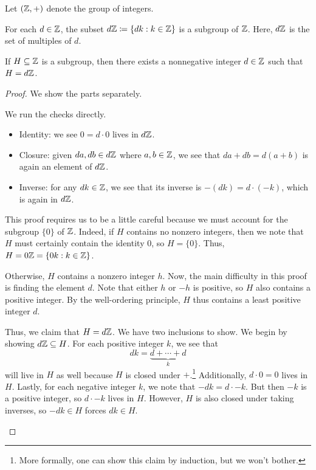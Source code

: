 \documentclass[../notes.tex]{subfiles}
\begin{document}
\begin{proposition}
    Let $(\mathbb Z,+)$ denote the group of integers.
    \begin{listalph}
        \item For each $d\in\mathbb Z$, the subset $d\mathbb Z\coloneqq\{dk:k\in\mathbb Z\}$ is a subgroup of $\mathbb Z$. Here, $d\mathbb Z$ is the set of multiples of $d$.
        \item If $H\subseteq\mathbb Z$ is a subgroup, then there exists a nonnegative integer $d\in\mathbb Z$ such that $H=d\mathbb Z$.
    \end{listalph}
\end{proposition}
\begin{proof}
    We show the parts separately.
    \begin{listalph}
        \item We run the checks directly.
        \begin{itemize}
            \item Identity: we see $0=d\cdot 0$ lives in $d\mathbb Z$.
            \item Closure: given $da,db\in d\mathbb Z$ where $a,b\in\mathbb Z$, we see that $da+db=d(a+b)$ is again an element of $d\mathbb Z$.
            \item Inverse: for any $dk\in\mathbb Z$, we see that its inverse is $-(dk)=d\cdot(-k)$, which is again in $d\mathbb Z$.
        \end{itemize}
        
        \item This proof requires us to be a little careful because we must account for the subgroup $\{0\}$ of $\mathbb Z$. Indeed, if $H$ contains no nonzero integers, then we note that $H$ must certainly contain the identity $0$, so $H=\{0\}$. Thus, $H=0\mathbb Z=\{0k:k\in\mathbb Z\}$.
        
        Otherwise, $H$ contains a nonzero integer $h$. Now, the main difficulty in this proof is finding the element $d$. Note that either $h$ or $-h$ is positive, so $H$ also contains a positive integer. By the well-ordering principle, $H$ thus contains a least positive integer $d$.
        
        Thus, we claim that $H=d\mathbb Z$. We have two inclusions to show. We begin by showing $d\mathbb Z\subseteq H$. For each positive integer $k$, we see that
        \[dk=\underbrace{d+\cdots+d}_k\]
        will live in $H$ as well because $H$ is closed under $+$.\footnote{More formally, one can show this claim by induction, but we won't bother.} Additionally, $d\cdot0=0$ lives in $H$. Lastly, for each negative integer $k$, we note that $-dk=d\cdot -k$. But then $-k$ is a positive integer, so $d\cdot -k$ lives in $H$. However, $H$ is also closed under taking inverses, so $-dk\in H$ forces $dk\in H$.
        

\end{listalph}
\end{proof}
\end{document}
